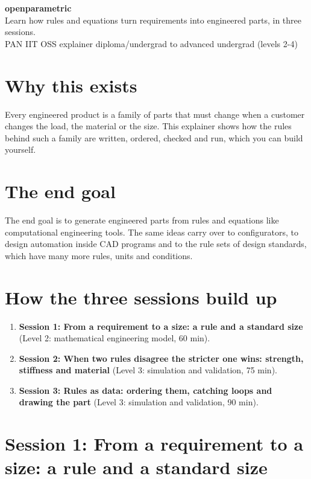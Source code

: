 \documentclass[11pt,a4paper]{article}
\begin{document}
\begin{center}{\LARGE\bfseries openparametric}\\[0.4em]{\large Learn how rules and equations turn requirements into engineered parts, in three sessions.}\\[0.2em]\small PAN IIT OSS explainer \textbullet{} diploma/undergrad to advanced undergrad (levels 2-4)\end{center}

\section*{Why this exists}
Every engineered product is a family of parts that must change when a customer changes the load, the material or the size. This explainer shows how the rules behind such a family are written, ordered, checked and run, which you can build yourself.

\section*{The end goal}
The end goal is to generate engineered parts from rules and equations like computational engineering tools. The same ideas carry over to configurators, to design automation inside CAD programs and to the rule sets of design standards, which have many more rules, units and conditions.

\section*{How the three sessions build up}
\begin{enumerate}[nosep]
\item \textbf{Session 1: From a requirement to a size: a rule and a standard size} (Level 2: mathematical engineering model, 60 min).
\item \textbf{Session 2: When two rules disagree the stricter one wins: strength, stiffness and material} (Level 3: simulation and validation, 75 min).
\item \textbf{Session 3: Rules as data: ordering them, catching loops and drawing the part} (Level 3: simulation and validation, 90 min).
\end{enumerate}

\section{Session 1: From a requirement to a size: a rule and a standard size}
\end{document}
